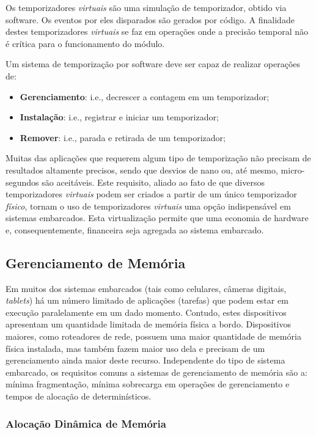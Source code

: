 Os temporizadores \emph{virtuais} são uma simulação de temporizador, obtido via software. Os eventos por eles disparados são gerados por código. A finalidade destes temporizadores \emph{virtuais} se faz em operações onde a precisão temporal não é crítica para o funcionamento do módulo.

Um sistema de temporização por software deve ser capaz de realizar operações de:

\begin{itemize}
	\item \textbf{Gerenciamento}: i.e., decrescer a contagem em um temporizador;
	\item \textbf{Instalação}: i.e., registrar e iniciar um temporizador;
	\item \textbf{Remover}: i.e., parada e retirada de um temporizador;	
\end{itemize}

Muitas das aplicações que requerem algum tipo de temporização não precisam de resultados altamente precisos, sendo que desvios de nano ou, até mesmo, micro-segundos são aceitáveis. Este requisito, aliado ao fato de que diversos temporizadores \emph{virtuais} podem ser criados a partir de um único temporizador \emph{físico}, tornam o uso de temporizadores \emph{virtuais} uma opção indispensável em sistemas embarcados. Esta virtualização permite que uma economia de hardware e, consequentemente, financeira seja agregada ao sistema embarcado.

\subsection{Gerenciamento de Memória}

Em muitos dos sistemas embarcados (tais como celulares, câmeras digitais, \emph{tablets}) há um número limitado de aplicações (tarefas) que  podem estar em execução paralelamente em um dado momento. Contudo, estes dispositivos apresentam um quantidade limitada de memória física a bordo. Dispositivos maiores, como roteadores de rede, possuem uma maior quantidade de memória física instalada, mas também fazem maior uso dela e precisam de um gerenciamento ainda maior deste recurso. Independente do tipo de sistema embarcado, os requisitos comuns a sistemas de gerenciamento de memória são a: mínima fragmentação, mínima sobrecarga em operações de gerenciamento e tempos de alocação de determinísticos.

\subsubsection{Alocação Dinâmica de Memória}

